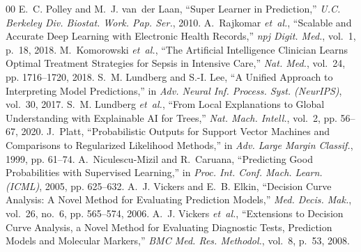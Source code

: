 \documentclass[conference]{IEEEtran}
\begin{document}
{\begin{thebibliography}{00}
E.~C. Polley and M.~J. van~der Laan, ``Super Learner in Prediction,'' \emph{U.C. Berkeley Div. Biostat. Work. Pap. Ser.}, 2010.
A.~Rajkomar \emph{et~al.}, ``Scalable and Accurate Deep Learning with Electronic Health Records,'' \emph{npj Digit. Med.}, vol.~1, p.~18, 2018.
M.~Komorowski \emph{et~al.}, ``The Artificial Intelligence Clinician Learns Optimal Treatment Strategies for Sepsis in Intensive Care,'' \emph{Nat. Med.}, vol.~24, pp. 1716--1720, 2018.
S.~M. Lundberg and S.-I. Lee, ``A Unified Approach to Interpreting Model Predictions,'' in \emph{Adv. Neural Inf. Process. Syst. (NeurIPS)}, vol.~30, 2017.
S.~M. Lundberg \emph{et~al.}, ``From Local Explanations to Global Understanding with Explainable AI for Trees,'' \emph{Nat. Mach. Intell.}, vol.~2, pp. 56--67, 2020.
J.~Platt, ``Probabilistic Outputs for Support Vector Machines and Comparisons to Regularized Likelihood Methods,'' in \emph{Adv. Large Margin Classif.}, 1999, pp. 61--74.
A.~Niculescu-Mizil and R.~Caruana, ``Predicting Good Probabilities with Supervised Learning,'' in \emph{Proc. Int. Conf. Mach. Learn. (ICML)}, 2005, pp. 625--632.
A.~J. Vickers and E.~B. Elkin, ``Decision Curve Analysis: A Novel Method for Evaluating Prediction Models,'' \emph{Med. Decis. Mak.}, vol.~26, no.~6, pp. 565--574, 2006.
A.~J. Vickers \emph{et~al.}, ``Extensions to Decision Curve Analysis, a Novel Method for Evaluating Diagnostic Tests, Prediction Models and Molecular Markers,'' \emph{BMC Med. Res. Methodol.}, vol.~8, p.~53, 2008.
\end{thebibliography}
}
\end{document}

